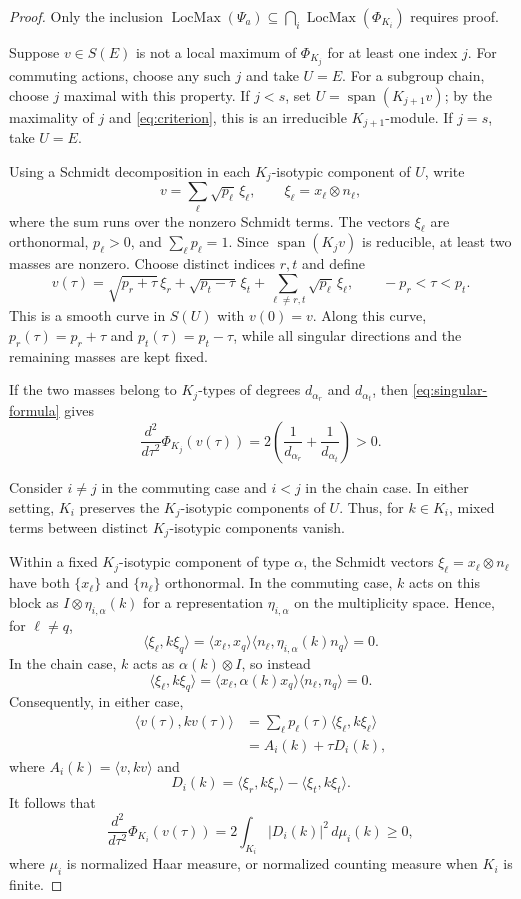\documentclass[10pt]{amsart}
\theoremstyle{remark}
\DeclareMathOperator{\LocMax}{LocMax}
\begin{document}
\begin{proof}
Only the inclusion $\LocMax(\Psi_a)\subseteq\bigcap_i\LocMax(\Phi_{K_i})$ requires proof.

Suppose $v\in S(E)$ is not a local maximum of $\Phi_{K_j}$
for at least one index $j$.
For commuting actions, choose any such $j$ and take $U=E$.
For a subgroup chain, choose $j$ maximal with this property.
If $j<s$, set $U=\operatorname{span}(K_{j+1}v)$;
by the maximality of $j$ and \eqref{eq:criterion},
this is an irreducible $K_{j+1}$-module.
If $j=s$, take $U=E$.

Using a Schmidt decomposition in each $K_j$-isotypic
component of $U$, write
\[
 v=\sum_\ell\sqrt{p_\ell}\,\xi_\ell,
 \qquad
 \xi_\ell=x_\ell\otimes n_\ell,
\]
where the sum runs over the nonzero Schmidt terms.
The vectors $\xi_\ell$ are orthonormal,
$p_\ell>0$, and $\sum_\ell p_\ell=1$.
Since $\operatorname{span}(K_jv)$ is reducible,
at least two masses are nonzero.
Choose distinct indices $r,t$ and define
\[
 v(\tau)
 =
 \sqrt{p_r+\tau}\,\xi_r
 +
 \sqrt{p_t-\tau}\,\xi_t
 +
 \sum_{\ell\neq r,t}\sqrt{p_\ell}\,\xi_\ell,
 \qquad
 -p_r<\tau<p_t.
\]
This is a smooth curve in $S(U)$ with $v(0)=v$.
Along this curve,
$p_r(\tau)=p_r+\tau$ and $p_t(\tau)=p_t-\tau$,
while all singular directions and the remaining masses
are kept fixed.

If the two masses belong to $K_j$-types of degrees $d_{\alpha_r}$ and $d_{\alpha_t}$, then
\eqref{eq:singular-formula} gives
\begin{equation}\label{eq:strict-mass-transfer}
 \frac{d^2}{d\tau^2}\Phi_{K_j}(v(\tau))
 =2\left(\frac1{d_{\alpha_r}}+\frac1{d_{\alpha_t}}\right)>0.
\end{equation}

Consider $i\neq j$ in the commuting case and $i<j$
in the chain case.
In either setting, $K_i$ preserves the $K_j$-isotypic
components of $U$.
Thus, for $k\in K_i$, mixed terms between distinct
$K_j$-isotypic components vanish.

Within a fixed $K_j$-isotypic component of type $\alpha$,
the Schmidt vectors
$\xi_\ell=x_\ell\otimes n_\ell$ have both
$\{x_\ell\}$ and $\{n_\ell\}$ orthonormal.
In the commuting case, $k$ acts on this block as
$I\otimes\eta_{i,\alpha}(k)$ for a representation
$\eta_{i,\alpha}$ on the multiplicity space.
Hence, for $\ell\neq q$,
\[
 \langle\xi_\ell,k\xi_q\rangle
 =
 \langle x_\ell,x_q\rangle
 \langle n_\ell,\eta_{i,\alpha}(k)n_q\rangle
 =
 0.
\]
In the chain case, $k$ acts as $\alpha(k)\otimes I$,
so instead
\[
 \langle\xi_\ell,k\xi_q\rangle
 =
 \langle x_\ell,\alpha(k)x_q\rangle
 \langle n_\ell,n_q\rangle
 =
 0.
\]
Consequently, in either case,
\[
 \begin{aligned}
 \langle v(\tau),kv(\tau)\rangle
 &=
 \sum_\ell p_\ell(\tau)
 \langle\xi_\ell,k\xi_\ell\rangle\\
 &=
 A_i(k)+\tau D_i(k),
 \end{aligned}
\]
where $A_i(k)=\langle v,kv\rangle$ and
\[
 D_i(k)
 =
 \langle\xi_r,k\xi_r\rangle
 -
 \langle\xi_t,k\xi_t\rangle.
\]
It follows that
\[
 \frac{d^2}{d\tau^2}\Phi_{K_i}(v(\tau))
 =
 2\int_{K_i}|D_i(k)|^2\,d\mu_i(k)
 \geq 0,
\]
where $\mu_i$ is normalized Haar measure,
or normalized counting measure when $K_i$ is finite.


\end{proof}
\end{document}
